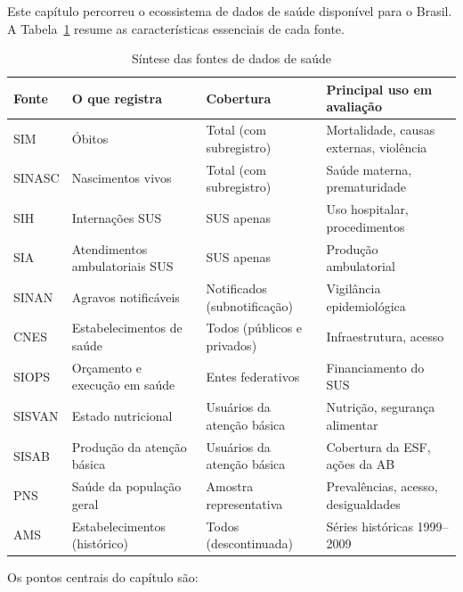 Este capítulo percorreu o ecossistema de dados de saúde disponível para o Brasil. A Tabela~\ref{tab:sintese_cap5} resume as características essenciais de cada fonte.

\begin{table}[H]
\centering
\caption{Síntese das fontes de dados de saúde}
\label{tab:sintese_cap5}
\small
\begin{tabularx}{\textwidth}{@{} p{2cm} p{3.5cm} >{\raggedright\arraybackslash}p{2.5cm} X @{}}
\toprule
\textbf{Fonte} & \textbf{O que registra} & \textbf{Cobertura} & \textbf{Principal uso em avaliação} \\
\midrule
SIM    & Óbitos                     & Total (com subregistro) & Mortalidade, causas externas, violência \\
SINASC & Nascimentos vivos          & Total (com subregistro) & Saúde materna, prematuridade \\
SIH    & Internações SUS            & SUS apenas & Uso hospitalar, procedimentos \\
SIA    & Atendimentos ambulatoriais SUS & SUS apenas & Produção ambulatorial \\
SINAN  & Agravos notificáveis       & Notificados (subnotificação) & Vigilância epidemiológica \\
CNES   & Estabelecimentos de saúde  & Todos (públicos e privados) & Infraestrutura, acesso \\
SIOPS  & Orçamento e execução em saúde & Entes federativos & Financiamento do SUS \\
SISVAN & Estado nutricional         & Usuários da atenção básica & Nutrição, segurança alimentar \\
SISAB  & Produção da atenção básica & Usuários da atenção básica & Cobertura da ESF, ações da AB \\
PNS    & Saúde da população geral   & Amostra representativa & Prevalências, acesso, desigualdades \\
AMS    & Estabelecimentos (histórico) & Todos (descontinuada) & Séries históricas 1999--2009 \\
\bottomrule
\end{tabularx}
\end{table}

Os pontos centrais do capítulo são:

